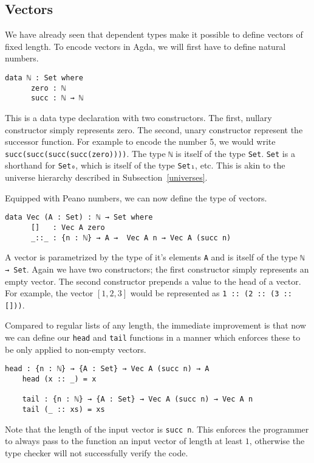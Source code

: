\documentclass[12pt]{article}
\begin{document}
\subsection{Vectors}
We have already seen that dependent types make it possible to define vectors of fixed length. To encode vectors in Agda, we will first have to define natural numbers.
\begin{Verbatim}[samepage=true]
    data ℕ : Set where
      zero : ℕ 
      succ : ℕ → ℕ
\end{Verbatim}
This is a data type declaration with two constructors. The first, nullary constructor simply represents zero. The second, unary constructor represent the successor function. For example to encode the number 5, we would write \verb|succ(succ(succ(succ(zero))))|.
The type \verb|ℕ| is itself of the type \verb|Set|. \verb|Set| is a shorthand for \verb|Set₀|, which is itself of the type \verb|Set₁|, etc. This is akin to the universe hierarchy described in Subsection~\ref{universes}.

Equipped with Peano numbers, we can now define the type of vectors.
\begin{Verbatim}[samepage=true]
    data Vec (A : Set) : ℕ → Set where
      []   : Vec A zero
      _::_ : {n : ℕ} → A →  Vec A n → Vec A (succ n)
\end{Verbatim}
A vector is parametrized by the type of it's elements \verb|A| and is itself of the type \verb|ℕ → Set|. Again we have two constructors; the first constructor simply represents an empty vector. The second constructor prepends a value to the head of a vector. For example, the vector $[1, 2, 3]$ would be represented as \verb|1 :: (2 :: (3 :: []))|.

Compared to regular lists of any length, the immediate improvement is that now we can define our \verb|head| and \verb|tail| functions in a manner which enforces these to be only applied to non-empty vectors.
\begin{Verbatim}[samepage=true]
    head : {n : ℕ} → {A : Set} → Vec A (succ n) → A
    head (x :: _) = x

    tail : {n : ℕ} → {A : Set} → Vec A (succ n) → Vec A n
    tail (_ :: xs) = xs
\end{Verbatim}
Note that the length of the input vector is \verb|succ n|. This enforces the programmer to always pass to the function an input vector of length at least $1$, otherwise the type checker will not successfully verify the code.
\end{document}
